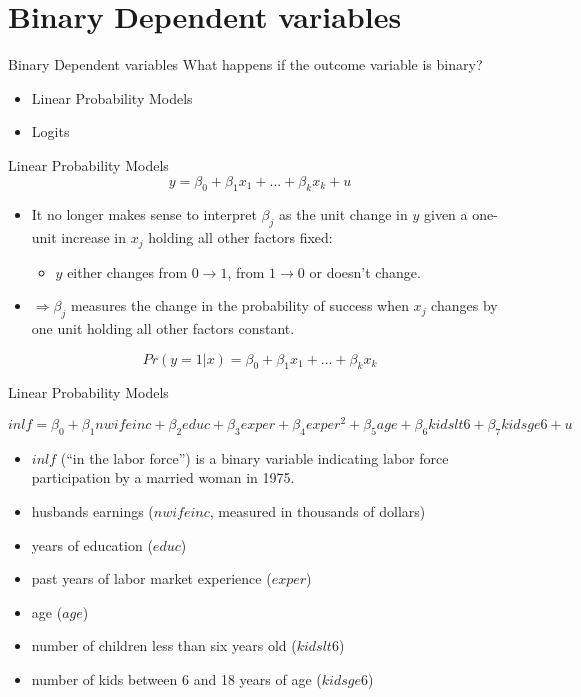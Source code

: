 \documentclass[
  ignorenonframetext,
]{beamer}
\providecommand{\tightlist}{%
  \setlength{\itemsep}{0pt}\setlength{\parskip}{0pt}}
\begin{document}
\hypertarget{binary-dependent-variables}{%
\section{Binary Dependent variables}\label{binary-dependent-variables}}

\begin{frame}{Binary Dependent variables}
\protect\hypertarget{binary-dependent-variables-1}{}
What happens if the outcome variable is binary?

\begin{itemize}
\item
  Linear Probability Models
\item
  Logits
\end{itemize}
\end{frame}

\begin{frame}{Linear Probability Models}
\protect\hypertarget{linear-probability-models}{}
\[
y=\beta_0+\beta_1x_1+...+\beta_kx_k+u
\]

\begin{itemize}
\item
  It no longer makes sense to interpret \(\beta_j\) as the unit change
  in \(y\) given a one-unit increase in \(x_j\) holding all other
  factors fixed:

  \begin{itemize}
  \tightlist
  \item
    \(y\) either changes from \(0\rightarrow 1\), from
    \(1 \rightarrow 0\) or doesn't change.
  \end{itemize}
\item
  \(\Rightarrow\beta_j\) measures the change in the probability of
  success when \(x_j\) changes by one unit holding all other factors
  constant.
\end{itemize}

\[
Pr(y=1|x)=\beta_0+\beta_1x_1+...+\beta_kx_k
\]
\end{frame}

\begin{frame}{Linear Probability Models}
\protect\hypertarget{linear-probability-models-1}{}
\footnotesize

\[
inlf=\beta_0+\beta_1 nwifeinc+\beta_2educ+\beta_3 exper+\beta_4exper^2+\beta_5age+\beta_6kidslt6+\beta_7kidsge6+u
\] \normalsize

\begin{itemize}
\item
  \(inlf\) (``in the labor force'') is a binary variable indicating
  labor force participation by a married woman in 1975.
\item
  husbands earnings (\(nwifeinc\), measured in thousands of dollars)
\item
  years of education (\(educ\))
\item
  past years of labor market experience (\(exper\))
\item
  age (\(age\))
\item
  number of children less than six years old (\(kidslt6\))
\item
  number of kids between 6 and 18 years of age (\(kidsge6\))
\end{itemize}
\end{frame}
\end{document}
